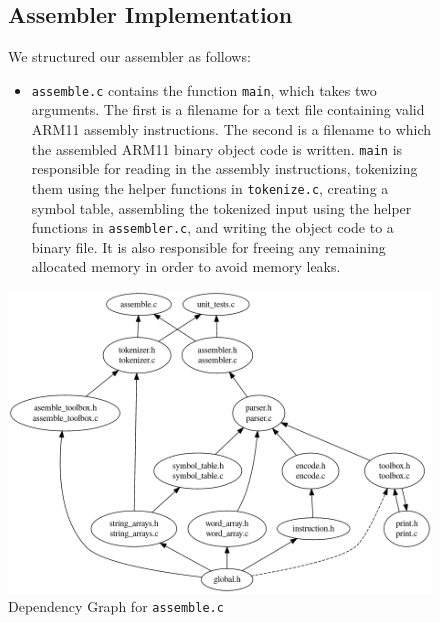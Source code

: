 \documentclass[10pt]{article}
\begin{document}
\begin{figure}[H]
\begin{minipage}{0.4\linewidth}

\subsection{Assembler Implementation}

We structured our assembler as follows:

\begin{itemize}
\item \texttt{assemble.c} contains the function \texttt{main}, which takes two arguments. The first is a filename for a text file containing valid ARM11 assembly instructions. The second is a filename to which the assembled ARM11 binary object code is written. \texttt{main} is responsible for reading in the assembly instructions, tokenizing them using the helper functions in \texttt{tokenize.c}, creating a symbol table, assembling the tokenized input using the helper functions in \texttt{assembler.c}, and writing the object code to a binary file. It is also responsible for freeing any remaining allocated memory in order to avoid memory leaks.
\end{itemize}

\end{minipage}
\hspace{0.05\linewidth}
\begin{minipage}{0.55\linewidth}

\centering
\includegraphics[scale=0.28]{Report/assemble.png}
\caption{Dependency Graph for \texttt{assemble.c}}

\end{minipage}
\end{figure}
\end{document}
